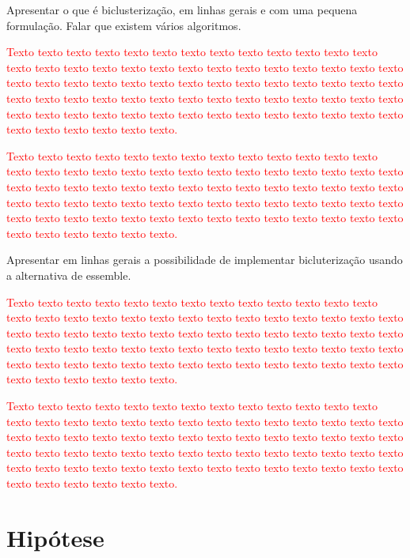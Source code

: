 \documentclass[normaltoc, espacoumemeio, pnumromarab,ruledheader]{abnt}
\begin{document}
Apresentar o que é biclusterização, em linhas gerais e com uma pequena formulação. Falar que existem vários algoritmos.

\textcolor{red}{Texto texto texto texto texto texto texto texto texto texto texto texto texto texto texto texto texto texto texto texto texto texto texto texto texto texto texto texto texto texto texto texto texto texto texto texto texto texto texto texto texto texto texto texto texto texto texto texto texto texto texto texto texto texto texto texto texto texto texto texto texto texto texto texto texto texto texto texto texto texto texto texto texto texto texto.}

\textcolor{red}{Texto texto texto texto texto texto texto texto texto texto texto texto texto texto texto texto texto texto texto texto texto texto texto texto texto texto texto texto texto texto texto texto texto texto texto texto texto texto texto texto texto texto texto texto texto texto texto texto texto texto texto texto texto texto texto texto texto texto texto texto texto texto texto texto texto texto texto texto texto texto texto texto texto texto texto.}

Apresentar em linhas gerais a possibilidade de implementar bicluterização usando a alternativa de essemble.

\textcolor{red}{Texto texto texto texto texto texto texto texto texto texto texto texto texto texto texto texto texto texto texto texto texto texto texto texto texto texto texto texto texto texto texto texto texto texto texto texto texto texto texto texto texto texto texto texto texto texto texto texto texto texto texto texto texto texto texto texto texto texto texto texto texto texto texto texto texto texto texto texto texto texto texto texto texto texto texto.}

\textcolor{red}{Texto texto texto texto texto texto texto texto texto texto texto texto texto texto texto texto texto texto texto texto texto texto texto texto texto texto texto texto texto texto texto texto texto texto texto texto texto texto texto texto texto texto texto texto texto texto texto texto texto texto texto texto texto texto texto texto texto texto texto texto texto texto texto texto texto texto texto texto texto texto texto texto texto texto texto.}

\section{Hipótese}

\end{document}

